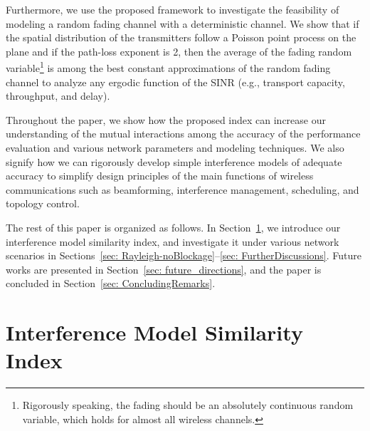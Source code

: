 \documentclass[12pt, draftclsnofoot, onecolumn]{IEEEtran}
\begin{document}
Furthermore, we use the proposed framework to investigate the feasibility of modeling a random fading channel with a deterministic channel. We show that if the spatial distribution of the transmitters follow a Poisson point process on the plane and if the path-loss exponent is 2, then the average of the fading random variable\footnote{Rigorously speaking, the fading should be an absolutely continuous random variable, which holds for almost all wireless channels.} is among the best constant approximations of the random fading channel to analyze any ergodic function of the SINR (e.g., transport capacity, throughput, and delay).

Throughout the paper, we show how the proposed index can increase our understanding of the mutual interactions among the accuracy of the performance evaluation and various network parameters and modeling techniques. We also signify how we can rigorously develop simple interference models of adequate accuracy to simplify design principles of the main functions of wireless communications such as beamforming, interference management, scheduling, and topology control.

The rest of this paper is organized as follows. In Section~\ref{sec: system-model}, we introduce our interference model similarity index, and investigate it under various network scenarios in Sections~\ref{sec: Rayleigh-noBlockage}--\ref{sec: FurtherDiscussions}. Future works are presented in Section~\ref{sec: future_directions}, and the paper is concluded in Section~\ref{sec: ConcludingRemarks}.



\section{Interference Model Similarity Index}\label{sec: system-model}
\end{document}
